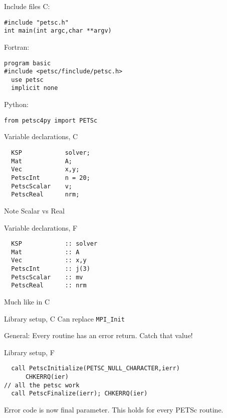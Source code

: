 

\begin{numberedframe}{Include files}
C:
\lstset{language=C}
\begin{lstlisting}
#include "petsc.h"
int main(int argc,char **argv)
\end{lstlisting}
Fortran:
\lstset{language=Fortran}
\begin{lstlisting}
program basic
#include <petsc/finclude/petsc.h>
  use petsc
  implicit none
\end{lstlisting}
Python:
\lstset{language=Python}
\begin{lstlisting}
from petsc4py import PETSc
\end{lstlisting}
\end{numberedframe}

\lstset{language=C}
\begin{numberedframe}{Variable declarations, C}
\begin{lstlisting}
  KSP            solver;
  Mat            A;
  Vec            x,y;
  PetscInt       n = 20;
  PetscScalar    v;
  PetscReal      nrm;
\end{lstlisting}
Note Scalar vs Real
\end{numberedframe}

\lstset{language=Fortran}
\begin{numberedframe}{Variable declarations, F}
\begin{lstlisting}
  KSP            :: solver
  Mat            :: A
  Vec            :: x,y
  PetscInt       :: j(3)
  PetscScalar    :: mv
  PetscReal      :: nrm
\end{lstlisting}
Much like in C
\end{numberedframe}

\lstset{language=C}

\begin{numberedframe}{Library setup, C}
Can replace \lstinline{MPI_Init}

General: Every routine has an error return. Catch that value!
\end{numberedframe}

\lstset{language=Fortran}
\begin{numberedframe}{Library setup, F}
\begin{lstlisting}
  call PetscInitialize(PETSC_NULL_CHARACTER,ierr)
      CHKERRQ(ier)
// all the petsc work
  call PetscFinalize(ierr); CHKERRQ(ier)
\end{lstlisting}
Error code is now final parameter. This holds for every PETSc routine.
\end{numberedframe}

